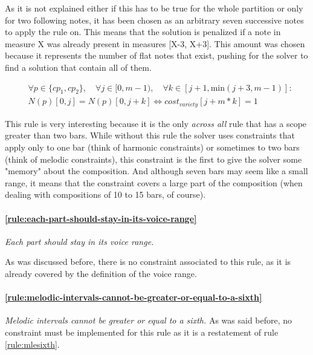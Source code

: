     As it is not explained either if this has to be true for the whole partition or only for two following notes, it has been chosen as an arbitrary seven successive notes to apply the rule on. This means that the solution is penalized if a note in measure X was already present in measures [X-3, X+3]. This amount was chosen because it represents the number of flat notes that exist, pushing for the solver to find a solution that contain all of them.

    \begin{equation} \begin{aligned}
    &\forall p \in \{cp_1, cp_2\}, \quad \forall j \in [0, m-1), \quad \forall k \in [j+1, \text{min} (j+3, m-1)] :\\ 
    &N(p)[0, j] = N(p)[0, j+k]\iff cost_{variety}[j+m*k]= 1
    \end{aligned} \end{equation}

    This rule is very interesting because it is the only \textit{across all} rule that has a scope greater than two bars. While without this rule the solver uses constraints that apply only to one bar (think of harmonic constraints) or sometimes to two bars (think of melodic constraints), this constraint is the first to give the solver some "memory" about the composition. And although seven bars may seem like a small range, it means that the constraint covers a large part of the composition (when dealing with compositions of 10 to 15 bars, of course).

    \paragraph{\hspace{.6cm}\ref{rule:each-part-should-stay-in-its-voice-range}}  \textit{Each part should stay in its voice range.}

    As was discussed before, there is no constraint associated to this rule, as it is already covered by the definition of the voice range.

    \paragraph{\hspace{0.6cm} \ref{rule:melodic-intervals-cannot-be-greater-or-equal-to-a-sixth}}  \textit{Melodic intervals cannot be greater or equal to a sixth.}
    As was said before, no constraint must be implemented for this rule as it is a restatement of rule \ref{rule:mlesixth}.

